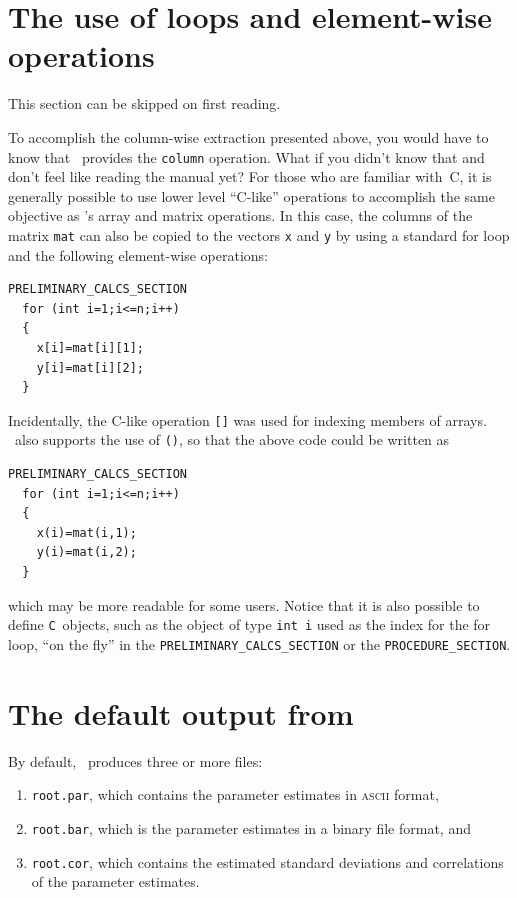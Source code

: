 \documentclass{admbmanual}
\begin{document}
\section{The use of loops and element-wise operations}

This section can be skipped on first reading.

To accomplish the column-wise extraction presented above, you would have to know
that \scAD\ provides the \texttt{column} operation. What if you didn't know that
and don't feel like reading the manual yet? For those who are familiar with~C,
it is generally possible to use lower level ``C-like'' operations to accomplish
the same objective as \scAD's array and matrix operations. In this case, the
columns of the matrix \texttt{mat} can also be copied to the vectors \texttt{x}
and \texttt{y} by using a standard for loop and the following element-wise
operations:
\begin{lstlisting}
PRELIMINARY_CALCS_SECTION
  for (int i=1;i<=n;i++)
  {
    x[i]=mat[i][1];
    y[i]=mat[i][2];
  }
\end{lstlisting}
Incidentally, the C-like operation \texttt{[]} was used for indexing members of
arrays. \ADM\ also supports the use of \texttt{()}, so that the above code could
be written as
\begin{lstlisting}
PRELIMINARY_CALCS_SECTION
  for (int i=1;i<=n;i++)
  {
    x(i)=mat(i,1);
    y(i)=mat(i,2);
  }
\end{lstlisting}
which may be more readable for some users. Notice that it is also possible to
define \texttt{C}~objects, such as the object of type \texttt{int i} used as the
index for the for loop, ``on the fly'' in the
\texttt{PRELIMINARY\_CALCS\_SECTION} or the \texttt{PROCEDURE\_SECTION}.

\section{The default output from \ADM}

By default, \ADM\ produces three or more files:
\begin{enumerate}
  \item \texttt{root.par}, which contains the parameter estimates in
  \textsc{ascii} format,

  \item \texttt{root.bar}, which is the parameter estimates in a binary file
  format, and

  \item \texttt{root.cor}, which contains the estimated standard deviations and
  correlations of the parameter estimates.
\end{enumerate}
\end{document}
